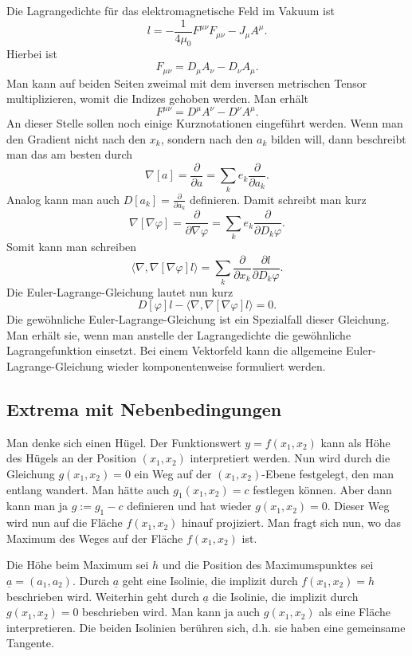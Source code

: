 \documentclass[a4paper,10pt,fleqn,twocolumn,twoside]{article}
\begin{document}
Die Lagrangedichte für das elektromagnetische Feld im Vakuum ist
\[l = -\frac{1}{4\mu_0} F^{\mu\nu}F_{\mu\nu} -J_\mu A^\mu.\]
Hierbei ist
\[F_{\mu\nu} = D_\mu A_\nu - D_\nu A_\mu.\]
Man kann auf beiden Seiten zweimal mit dem inversen metrischen
Tensor multiplizieren, womit die Indizes gehoben werden. Man erhält
\[F^{\mu\nu} = D^\mu A^\nu - D^\nu A^\mu.\]
An dieser Stelle sollen noch einige Kurznotationen eingeführt werden.
Wenn man den Gradient nicht nach den $x_k$, sondern nach
den $a_k$ bilden will, dann beschreibt man das am besten durch
\[\nabla[a] = \frac{\partial}{\partial a}
= \sum_k e_k\frac{\partial}{\partial a_k}.\]
Analog kann man auch $D[a_k]=\frac{\partial}{\partial a_k}$
definieren.
Damit schreibt man kurz
\[\nabla[\nabla\varphi] = \frac{\partial}{\partial\nabla\varphi}
= \sum_k e_k\frac{\partial}{\partial D_k\varphi}.\]
Somit kann man schreiben
\[\langle\nabla,\nabla[\nabla\varphi]l\rangle
= \sum_k \frac{\partial}{\partial x_k}
\frac{\partial l}{\partial D_k\varphi}.\]
Die Euler-Lagrange-Gleichung lautet nun kurz
\[D[\varphi]l-\langle\nabla,\nabla[\nabla\varphi]l\rangle=0.\]
Die gewöhnliche Euler-Lagrange-Gleichung ist ein Spezialfall dieser
Gleichung. Man erhält sie, wenn man anstelle der Lagrangedichte
die gewöhnliche Lagrangefunktion einsetzt. Bei einem Vektorfeld
kann die allgemeine Euler-Lagrange-Gleichung wieder komponentenweise
formuliert werden.

\subsection{Extrema mit Nebenbedingungen}

Man denke sich einen Hügel. Der Funktionswert $y=f(x_1,x_2)$ kann
als Höhe des Hügels an der Position $(x_1,x_2)$ interpretiert
werden. Nun wird durch die Gleichung $g(x_1,x_2)=0$ ein Weg auf der
$(x_1,x_2)$-Ebene festgelegt, den man entlang wandert.
Man hätte auch $g_1(x_1,x_2)=c$
festlegen können. Aber dann kann man ja $g:=g_1-c$ definieren und
hat wieder $g(x_1,x_2)=0$. Dieser Weg wird nun auf die Fläche
$f(x_1,x_2)$ hinauf projiziert. Man fragt sich nun, wo das Maximum
des Weges auf der Fläche $f(x_1,x_2)$ ist.

Die Höhe beim Maximum sei $h$ und die Position des Maximumspunktes
sei $\underline a = (a_1,a_2)$. Durch $\underline a$ geht eine
Isolinie, die implizit durch $f(x_1,x_2)=h$ beschrieben wird.
Weiterhin geht durch $\underline a$ die
Isolinie, die implizit durch $g(x_1,x_2)=0$ beschrieben wird.
Man kann ja auch $g(x_1,x_2)$ als eine Fläche interpretieren.
Die beiden Isolinien berühren sich, d.h. sie
haben eine gemeinsame Tangente.
\end{document}
